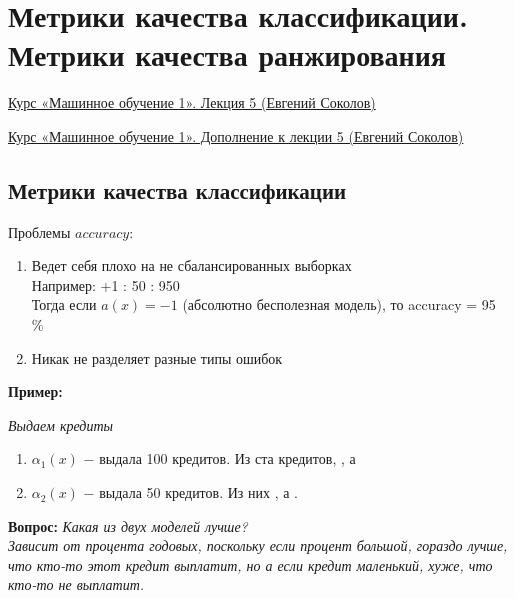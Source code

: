 \newpage
\section{Метрики качества классификации. Метрики качества ранжирования}
    \href{https://www.youtube.com/watch?v=Q824WEEnDVA&list=PLEqoHzpnmTfChItexxg2ZfxCsm-8QPsdS&index=5}{Курс «Машинное обучение 1». Лекция 5 (Евгений Соколов) }

    \href{https://www.youtube.com/watch?v=HIHAPyuezkU&list=PLEqoHzpnmTfChItexxg2ZfxCsm-8QPsdS&index=6}{Курс «Машинное обучение 1». Дополнение к лекции 5 (Евгений Соколов)}

    \subsection{Метрики качества классификации}
        Проблемы $accuracy$:
        \begin{enumerate}
            \item Ведет себя плохо на не сбалансированных выборках\\
                Например: \quad +1 : 50 : 950\\ 
                Тогда если $a(x) = -1$ (абсолютно бесполезная модель), то accuracy = 95 \%
            
            \item Никак не разделяет разные типы ошибок
        \end{enumerate}

        \textbf{Пример:}\\
        \begin{center}
            \textit{Выдаем кредиты}
        \end{center}
        
        \begin{enumerate}
            \item $\alpha_1(x)$ $-$ выдала 100 кредитов. Из ста кредитов, , а 
            \item $\alpha_2(x)$ $-$ выдала 50 кредитов. Из них , а .
        \end{enumerate}

        \begin{center}
            \textbf{Вопрос:} \textit{Какая из двух моделей лучше?}\\
            \textit{Зависит от процента годовых, поскольку если процент большой, гораздо лучше, что кто-то этот кредит выплатит, но а если кредит маленький, хуже, что кто-то не выплатит.}
        \end{center}

